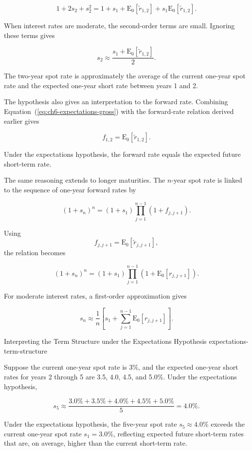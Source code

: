 \[
1+2s_2+s_2^2
=
1+s_1+\mathrm{E}_0[\widetilde{r}_{1,2}]
+s_1\mathrm{E}_0[\widetilde{r}_{1,2}].
\]

When interest rates are moderate, the second-order terms are small. Ignoring these terms gives

\begin{equation}
s_2
\approx
\frac{s_1+\mathrm{E}_0[\widetilde{r}_{1,2}]}{2}.
\label{eq:ch6-expectations-two-year}
\end{equation}

The two-year spot rate is approximately the average of the current one-year spot rate and the expected one-year short rate between years 1 and 2.

The hypothesis also gives an interpretation to the forward rate. Combining Equation~(\ref{eq:ch6-expectations-gross}) with the forward-rate relation derived earlier gives

\begin{equation}
f_{1,2}
=
\mathrm{E}_0[\widetilde{r}_{1,2}].
\label{eq:ch6-forward-expectation}
\end{equation}

Under the expectations hypothesis, the forward rate equals the expected future short-term rate.

The same reasoning extends to longer maturities. The $n$-year spot rate is linked to the sequence of one-year forward rates by

\begin{equation}
(1+s_n)^n
=
(1+s_1)
\prod_{j=1}^{n-1}
(1+f_{j,j+1}).
\label{eq:ch6-spot-forward-general}
\end{equation}

Using
\[
f_{j,j+1}
=
\mathrm{E}_0[\widetilde{r}_{j,j+1}],
\]
the relation becomes

\begin{equation}
(1+s_n)^n
=
(1+s_1)
\prod_{j=1}^{n-1}
\left(1+\mathrm{E}_0[r_{j,j+1}]\right).
\label{eq:ch6-expectations-general-gross}
\end{equation}

For moderate interest rates, a first-order approximation gives

\begin{equation}
s_n
\approx
\frac{1}{n}
\left[
s_1
+
\sum_{j=1}^{n-1}
\mathrm{E}_0[r_{j,j+1}]
\right].
\label{eq:ch6-expectations-general}
\end{equation}

\begin{example}{Interpreting the Term Structure under the Expectations Hypothesis} {expectations-term-structure}

Suppose the current one-year spot rate is 3\%, and the expected one-year short rates for years 2 through 5 are 3.5, 4.0, 4.5, and 5.0\%. Under the expectations hypothesis,

\[
s_5
\approx
\frac{
3.0\%+3.5\%+4.0\%+4.5\%+5.0\%
}{5}
=
4.0\%.
\]

Under the expectations hypothesis, the five-year spot rate \(s_5\approx4.0\%\) exceeds the current one-year spot rate \(s_1=3.0\%\), reflecting expected future short-term rates that are, on average, higher than the current short-term rate.

\end{example}

